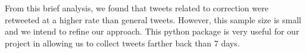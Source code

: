\documentclass[11pt]{article}
\begin{document}
    From this brief analysis, we found that tweets related to correction
were retweeted at a higher rate than general tweets. However, this
sample size is small and we intend to refine our approach. This python
package is very useful for our project in allowing us to collect tweets
farther back than 7 days.


    
    
    
    
\end{document}
